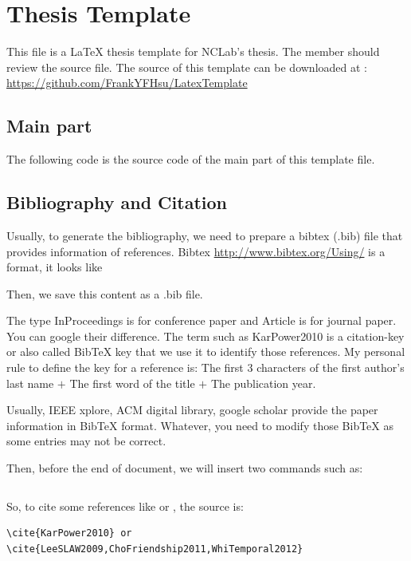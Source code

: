 \chapter{Thesis Template}

This file is a {\LaTeX} thesis template for NCLab's thesis.
The member should review the source file.
The source of this template can be downloaded at : \url{https://github.com/FrankYFHsu/LatexTemplate}

\section{Main part}
The following code is the source code of the main part of this template file.



\section{Bibliography and Citation}

Usually, to generate the bibliography, we need to prepare a bibtex (.bib) file that provides information of references.
Bibtex \url{http://www.bibtex.org/Using/} is a format, it looks like 

Then, we save this content as a .bib file.

The type InProceedings is for conference paper and Article is for journal paper. You can google their difference.
The term such as KarPower2010 is a citation-key or also called BibTeX key that we use it to identify those references.
My personal rule to define the key for a reference is: The first 3 characters of the first author’s last name $+$ The first word of the title $+$ The publication year.

Usually, IEEE xplore, ACM digital library, google scholar provide the paper information in BibTeX format.
Whatever, you need to modify those BibTeX as some entries may not be correct.

Then, before the end of document, we will insert two commands such as:
\begin{lstlisting}[language=Tex]
 % Usually we follow IEEE style

\end{lstlisting}

So, to cite some references like \cite{KarPower2010} or \cite{LeeSLAW2009,ChoFriendship2011,WhiTemporal2012},
the source is:
\begin{lstlisting}[language=Tex]
\cite{KarPower2010} or \cite{LeeSLAW2009,ChoFriendship2011,WhiTemporal2012}
\end{lstlisting}


